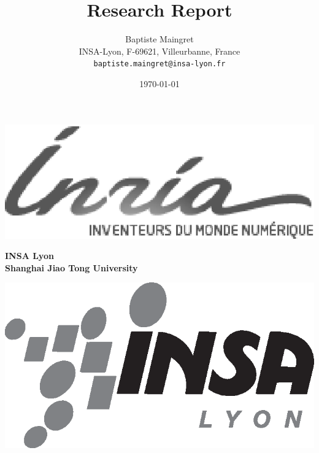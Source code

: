 \documentclass[a4paper]{article}
\begin{document}
\vfill
\begin{minipage}[b]{0.3\columnwidth}
\includegraphics[width=\columnwidth]{logo/inria.eps}%
\end{minipage}
\hfill
\begin{minipage}{0.3\columnwidth}
\small
\centering
\textbf{
INSA Lyon \\ %
Shanghai Jiao Tong University
}
\end{minipage}
\hfill
\begin{minipage}[b]{0.25\columnwidth}
\includegraphics[width=\columnwidth]{logo/insa-noir.eps}%
\end{minipage}

\newpage

%
%

\title{Research Report}

\author{Baptiste Maingret\\[10pt]
INSA-Lyon, F-69621, Villeurbanne, France\\
\texttt{baptiste.maingret@insa-lyon.fr}}

\date{\today}
\newcommand{\Keywords}[1]{\par\noindent 
{\small{\em Keywords\/}: Context-Oriented Programming, Golo, Java, System reasoning, Dynamic Language}}
\maketitle
\end{document}
